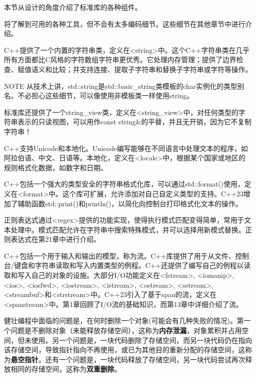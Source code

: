 
本节从设计的角度介绍了标准库的各种组件。

将了解到可用的各种工具，但不会有太多编码细节。这些细节在其他章节中进行介绍。


C++提供了一个内置的字符串类，定义在<string>中。这个C++字符串类在几乎所有方面都比C风格的字符数组字符串更优秀。它处理内存管理；提供了边界检查、赋值语义和比较；并支持连接、提取子字符串和替换子字符串或字符等操作。

\begin{myNotic}{NOTE}
从技术上讲，std::string是std::basic\_string类模板的char实例化的类型别名。不必担心这些细节，可以像使用非模板类一样使用string。
\end{myNotic}

标准库还提供了一个string\_view类，定义在<string\_view>中，对任何类型的字符串表示的只读视图，可以用作const string\&的平替，并且无开销，因为它不复制字符串！

C++支持Unicode和本地化。Unicode编写能够在不同语言中处理文本的程序，如阿拉伯语、中文、日语等。本地化，定义在<locale>中，根据某个国家或地区的规则格式化数据，如数字和日期。

C++包括一个强大的类型安全的字符串格式化库，可以通过std::format()使用，定义在<format>中。这个库可扩展，允许添加对自己自定义类型的支持。C++23增加了辅助函数std::print()和println()，以简化向控制台打印格式化文本的操作。


正则表达式通过<regex>提供的功能实现，使得执行模式匹配变得简单，常用于文本处理中。模式匹配允许在字符串中搜索特殊模式，并可以选择用新模式替换。正则表达式在第21章中进行介绍。


C++包括一个用于输入和输出的模型，称为流。C++库提供了用于从文件、控制台/键盘和字符串读取和写入内置类型的例程。C++还提供了编写自己的例程以读取和写入自己的对象的设施。大部分I/O功能定义在<fstream>, <iomanip>, <ios>, <iosfwd>, <iostream>, <istream>, <ostream>, <sstream>, <streambuf>和<strstream>中。C++23引入了基于span的流，定义在<spanstream>中。第1章回顾了I/O流的基础知识，而第13章中详细介绍了流。


健壮编程中面临的问题是，在何时删除一个对象(可能会有几种失败的情况)。第一个问题是不删除对象（未能释放存储空间），这称为\textbf{内存泄漏}，对象累积并占用空间，但未使用。另一个问题是，一块代码删除了存储空间，而另一块代码仍在指向该存储空间，导致指针指向不再使用，或已为其他目的重新分配的存储空间，这称为\textbf{悬空指针}。还有一个问题是，一块代码释放了存储空间，另一块代码尝试再次释放相同的存储空间，这称为\textbf{双重删除}。

